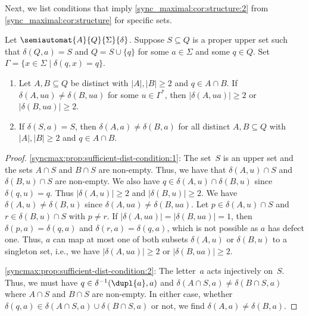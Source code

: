 Next, we list conditions that imply \cref{sync_maximal:cor:structure:2}
from \cref{sync_maximal:cor:structure} for specific sets.

\begin{proposition} \label{syncmax:prop:sufficient-dist-condition}
	Let $\semiautomat{A}{Q}{\Sigma}{\delta}$. Suppose $S \subseteq Q$
	is a proper upper set such that $\delta(Q,a) = S$ and 
	$Q = S \cup \{q\}$ for some $a \in \Sigma$ and some $q \in Q$.
    Set $\Gamma = \{ x \in \Sigma \mid \delta(q, x) = q \}$.
	
	\begin{enumerate}
	\item \label{syncmax:prop:sufficient-dist-condition:1} Let $A,B \subseteq Q$ be distinct with $|A|,|B| \ge 2$
	and $q \in A \cap B$.
	If $\delta(A, ua) \ne \delta(B, ua)$ for some $u \in \Gamma^*$,
	then $|\delta(A, ua)| \ge 2$ or $|\delta(B, ua)| \ge 2$.	
	
	\item \label{syncmax:prop:sufficient-dist-condition:2} If $\delta(S, a) = S$, then $\delta(A, a) \ne \delta(B, a)$
	for all distinct $A,B \subseteq Q$ with $|A|,|B| \ge 2$ 
	and $q \in A \cap B$.
	\end{enumerate}	
\end{proposition}
\begin{proof}
\ref{syncmax:prop:sufficient-dist-condition:1}: The set~$S$ is an upper set and 
 the sets $A \cap S$ and $B\cap S$ are non-empty. Thus, we have that $\delta(A, u) \cap S$
 and $\delta(B, u) \cap S$ are non-empty.
 We also have $q \in \delta(A, u) \cap \delta(B, u)$
 since $\delta(q, u) = q$.
 Thus $|\delta(A, u)| \ge 2$ and $|\delta(B, u)| \ge 2$.
 We have $\delta(A, u) \ne \delta(B, u)$ since $\delta(A, ua) \ne \delta(B, ua)$.
 Let $p \in \delta(A, u) \cap S$
 and $r \in \delta(B, u) \cap S$ with $p \ne r$.
 If $|\delta(A, ua)| = |\delta(B, ua)| = 1$,
 then $\delta(p, a) = \delta(q, a)$
 and $\delta(r, a) = \delta(q, a)$, 
 which is not possible as $a$ has defect one.
 Thus, $a$ can map at most one
 of both subsets $\delta(A, u)$
 or $\delta(B, u)$ to a singleton set, i.e.,
 we have $|\delta(A, ua)| \ge 2$ or $|\delta(B, ua)| \ge 2$.	

\ref{syncmax:prop:sufficient-dist-condition:2}: The letter~$a$ acts injectively on~$S$. Thus, we must have $q \in \delta^{-1}(\dupl{a}, a)$
and $\delta(A \cap S, a) \ne \delta(B \cap S, a)$
where $A\cap S$ and $B \cap S$ are non-empty.
In either case, whether $\delta(q, a) \in \delta(A\cap S, a) \cup \delta(B \cap S, a)$
or not, we find $\delta(A, a) \ne \delta(B, a)$.
\end{proof}

